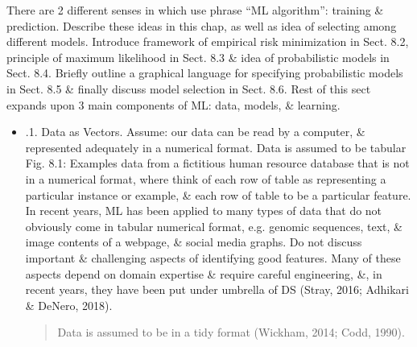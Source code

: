 \documentclass{article}
\begin{document}
\begin{itemize}
\begin{itemize}
		There are 2 different senses in which use phrase ``ML algorithm'': training \& prediction. Describe these ideas in this chap, as well as idea of selecting among different models. Introduce framework of empirical risk minimization in Sect. 8.2, principle of maximum likelihood in Sect. 8.3 \& idea of probabilistic models in Sect. 8.4. Briefly outline a graphical language for specifying probabilistic models in Sect. 8.5 \& finally discuss model selection in Sect. 8.6. Rest of this sect expands upon 3 main components of ML: data, models, \& learning.
		\begin{itemize}
			\item {.1. Data as Vectors.} Assume: our data can be read by a computer, \& represented adequately in a numerical format. Data is assumed to be tabular {\sf Fig. 8.1: Examples data from a fictitious human resource database that is not in a numerical format}, where think of each row of table as representing a particular instance or example, \& each row of table to be a particular feature. In recent years, ML has been applied to many types of data that do not obviously come in tabular numerical format, e.g. genomic sequences, text, \& image contents of a webpage, \& social media graphs. Do not discuss important \& challenging aspects of identifying good features. Many of these aspects depend on domain expertise \& require careful engineering, \&, in recent years, they have been put under umbrella of DS (Stray, 2016; Adhikari  \& DeNero, 2018).				
			\begin{quote}
				Data is assumed to be in a tidy format (Wickham, 2014; Codd, 1990).
			\end{quote}

\end{itemize}
\end{itemize}
\end{itemize}
\end{document}
